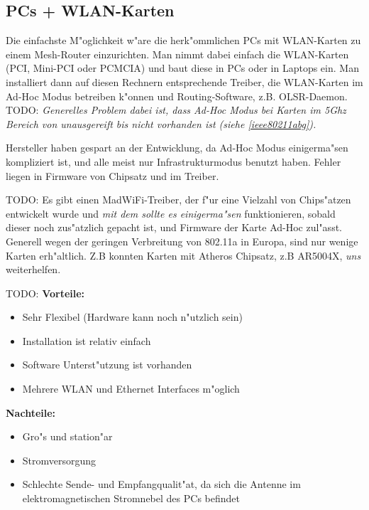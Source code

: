 \subsection{PCs + WLAN-Karten}

Die einfachste M"oglichkeit w"are die herk"ommlichen PCs mit WLAN-Karten
zu einem Mesh-Router einzurichten.
Man nimmt dabei einfach die WLAN-Karten (PCI, Mini-PCI oder PCMCIA) und
baut diese in PCs oder in Laptops ein. Man installiert dann auf diesen
Rechnern entsprechende Treiber, die WLAN-Karten im Ad-Hoc Modus betreiben
k"onnen und Routing-Software, z.B. OLSR-Daemon.
TODO: 	
\emph{Generelles Problem dabei ist, dass Ad-Hoc Modus bei Karten im 5Ghz 
Bereich von unausgereift bis nicht vorhanden ist (siehe \ref{ieee80211abg}).}

Hersteller haben gespart an der Entwicklung, da Ad-Hoc Modus
einigerma"sen kompliziert ist, und alle meist nur Infrastrukturmodus
benutzt haben. Fehler liegen in Firmware von Chipsatz und im Treiber.

TODO: 	
Es gibt einen MadWiFi-Treiber, der f"ur eine Vielzahl von Chips"atzen
entwickelt wurde und \emph{mit dem sollte es einigerma"sen} funktionieren, sobald
dieser noch zus"atzlich gepacht ist, und Firmware der Karte Ad-Hoc zul"asst.
Generell wegen der geringen Verbreitung von 802.11a in Europa, sind
nur wenige Karten erh"altlich. Z.B konnten Karten mit Atheros Chipsatz,
z.B AR5004X, \emph{uns} weiterhelfen.

TODO: 	
\textbf{Vorteile:}

\begin{itemize} 
\item Sehr Flexibel (Hardware kann noch n"utzlich sein)
\item Installation ist relativ einfach
\item Software Unterst"utzung ist vorhanden
\item Mehrere WLAN und Ethernet Interfaces m"oglich 
\end{itemize}

\textbf{Nachteile: }
\begin{itemize}
\item Gro"s und station"ar
\item Stromversorgung 
\item Schlechte Sende- und Empfangqualit"at, da sich die Antenne im
elektromagnetischen Stromnebel des PCs befindet
\end{itemize}





